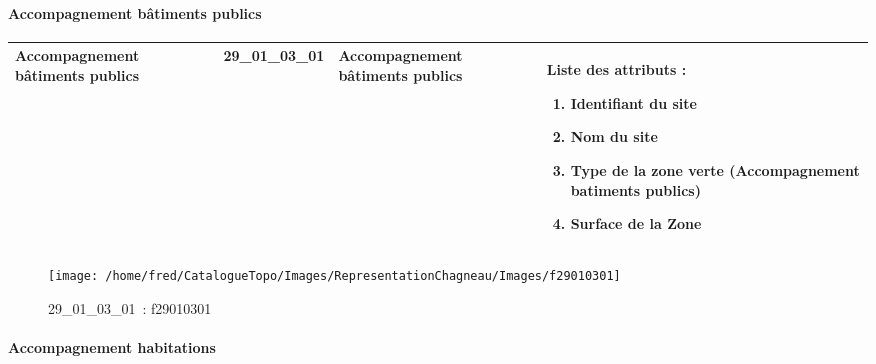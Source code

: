 \documentclass[12pt,titlepage]{book}
\begin{document}
\paragraph{Accompagnement bâtiments publics}
\noindent
\vspace{\baselineskip}

\renewcommand{\arraystretch}{1.2}
\begin{supertabular}{|p{10cm}|c|p{13cm}|p{12cm}|}
 Accompagnement bâtiments publics & 29\_01\_03\_01 & Accompagnement bâtiments publics & Liste des attributs :
\begin{enumerate}
  \item Identifiant du site  \item Nom du site  \item Type de la zone verte (Accompagnement batiments publics)  \item Surface de la Zone\end{enumerate}
\\
\hline
\end{supertabular}
\begin{figure}[h!]
  \hfill         %
  \begin{minipage}[t]{3cm}
    \begin{center}
      \texttt{[image: /home/fred/CatalogueTopo/Images/RepresentationChagneau/Images/f29010301]}
      \caption[~29\_01\_03\_01]{\small{29\_01\_03\_01~:} \tiny{f29010301}}\label{f29010301}
    \end{center}
  \end{minipage}
\end{figure}


\paragraph{Accompagnement habitations}
\noindent
\vspace{\baselineskip}
\end{document}
